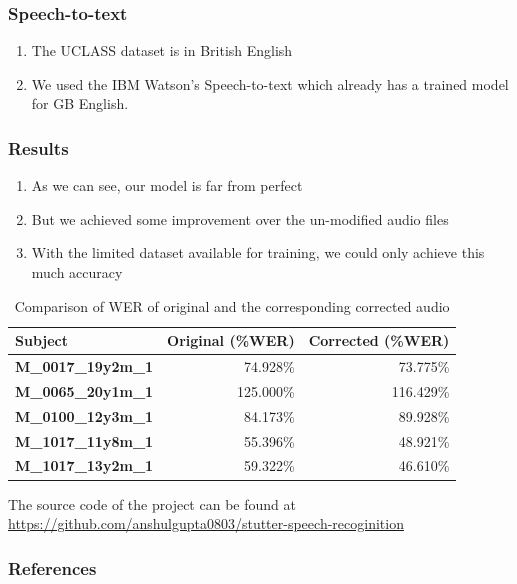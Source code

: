 \documentclass{beamer}
\begin{document}
\begin{frame}
\frametitle{Speech-to-text}
\begin{enumerate}
 \item The UCLASS dataset \cite{uclass} is in British English
 \item We used the IBM Watson's Speech-to-text \cite{speechToText} which already has a trained model for GB English.
\end{enumerate}
\end{frame}


\begin{frame}
\frametitle{Results}
\begin{enumerate}
 \item As we can see, our model is far from perfect
 \item But we achieved some improvement over the un-modified audio files
 \item With the limited dataset available for training, we could only achieve this much accuracy
\end{enumerate}

\begin{table}[ht]
\centering
\caption{Comparison of WER of original and the corresponding corrected audio}
\label{table:werComparision}
\begin{tabular}{|l|r|r|}
\hline
\textbf{Subject}           & \multicolumn{1}{l|}{\textbf{Original (\%WER)}} & \multicolumn{1}{l|}{\textbf{Corrected (\%WER)}} \\ \hline
\textbf{M\_0017\_19y2m\_1} & 74.928\%                                       & 73.775\%                                        \\ \hline
\textbf{M\_0065\_20y1m\_1} & 125.000\%                                      & 116.429\%                                       \\ \hline
\textbf{M\_0100\_12y3m\_1} & 84.173\%                                       & 89.928\%                                        \\ \hline
\textbf{M\_1017\_11y8m\_1} & 55.396\%                                       & 48.921\%                                        \\ \hline
\textbf{M\_1017\_13y2m\_1} & 59.322\%                                       & 46.610\%                                        \\ \hline
\end{tabular}
\end{table}

\footnotesize{The source code of the project can be found at \href{https://github.com/anshulgupta0803/stutter-speech-recoginition}{https://github.com/anshulgupta0803/stutter-speech-recoginition}}
\end{frame}


\begin{frame}
\frametitle{References}


\end{frame}
\end{document}
